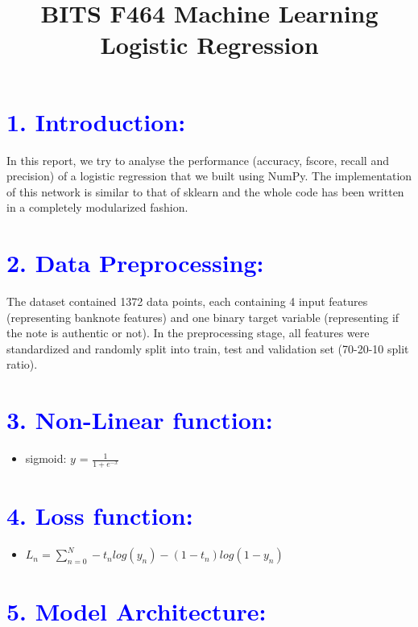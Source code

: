 \documentclass[a4paper,10pt,twoside]{article}
\title
{
\LARGE BITS F464 Machine Learning \\
\LARGE Logistic Regression
}
\date{}
\author{}
\begin{document}
\maketitle
\section*{\textcolor{blue}{1. Introduction:}}
In this report, we try to analyse the performance (accuracy, fscore, recall and precision) of a logistic regression that we built using NumPy. The implementation of this network is similar to that of sklearn and the whole code has been written in a completely modularized fashion.

\section*{\textcolor{blue}{2. Data Preprocessing:}}
The dataset contained 1372 data points, each containing 4 input features (representing banknote features) and one binary target variable (representing if the note is authentic or not). In the preprocessing stage, all features were standardized and randomly split into train, test and validation set  (70-20-10 split ratio).

\section*{\textcolor{blue}{3. Non-Linear function:}}
\begin{itemize}
\item{sigmoid: $y$ = $\frac{1}{1 + e^{-x}}$}
\end{itemize}

\section*{\textcolor{blue}{4. Loss function:}}
\begin{itemize}
\item{$L_n = \sum_{n=0}^{N} -t_nlog(y_n)-(1-t_n)log(1-y_n)$} 
\end{itemize}

\section*{\textcolor{blue}{5. Model Architecture:}}
\end{document}
